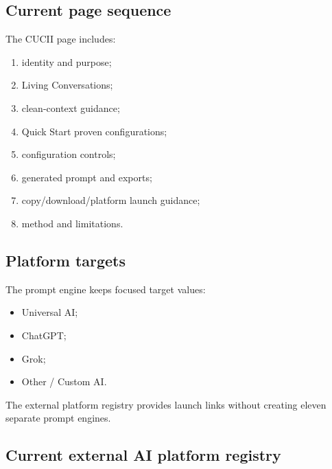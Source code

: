 \documentclass[11pt,letterpaper]{article}
\begin{document}
\subsection{Current page sequence}

The CUCII page includes:

\begin{enumerate}
    \item identity and purpose;
    \item Living Conversations;
    \item clean-context guidance;
    \item Quick Start proven configurations;
    \item configuration controls;
    \item generated prompt and exports;
    \item copy/download/platform launch guidance;
    \item method and limitations.
\end{enumerate}

\subsection{Platform targets}

The prompt engine keeps focused target values:

\begin{itemize}
    \item Universal AI;
    \item ChatGPT;
    \item Grok;
    \item Other / Custom AI.
\end{itemize}

The external platform registry provides launch links without creating eleven
separate prompt engines.

\subsection{Current external AI platform registry}
\end{document}
